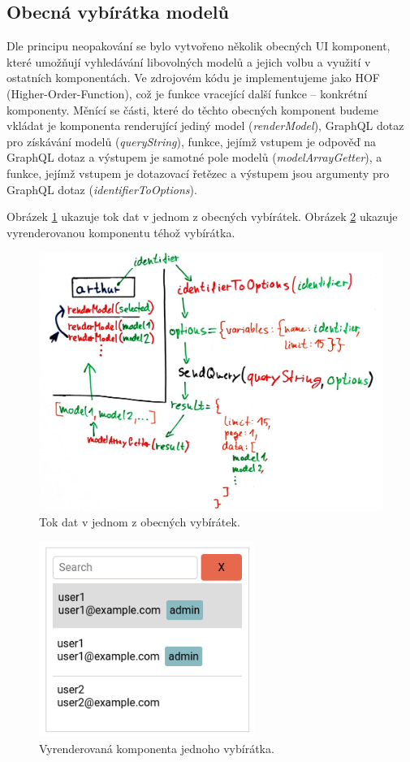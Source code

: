\subsection{Obecná vybírátka modelů}

Dle principu neopakování se bylo vytvořeno několik obecných UI komponent, které umožňují vyhledávání libovolných
modelů a jejich volbu a využití v ostatních komponentách. Ve zdrojovém kódu je implementujeme jako
HOF (Higher-Order-Function), což je funkce vracející další funkce -- konkrétní komponenty.
Měnící se části, které do těchto obecných komponent budeme vkládat je komponenta renderující jediný model
(\textit{renderModel}),
GraphQL dotaz pro získávání modelů (\textit{queryString}), funkce, jejímž vstupem je odpověď na GraphQL dotaz a výstupem je
samotné pole modelů (\textit{modelArrayGetter}), a funkce, jejímž vstupem je dotazovací řetězec a výstupem jsou
argumenty pro GraphQL dotaz (\textit{identifierToOptions}).

Obrázek \ref{fig:picker_lifecycle} ukazuje tok dat v jednom z obecných vybírátek.
Obrázek \ref{fig:picker_component} ukazuje vyrenderovanou komponentu téhož vybírátka.

\begin{figure}[!htb] \centering
  \includegraphics[width=145mm]{../img/picker_lifecycle.jpg}
  \caption{Tok dat v jednom z obecných vybírátek.}
  \label{fig:picker_lifecycle}
\end{figure}

\begin{figure}[!htb] \centering
  \includegraphics[width=70mm]{../img/picker_component.png}
  \caption{Vyrenderovaná komponenta jednoho vybírátka.}
  \label{fig:picker_component}
\end{figure}

